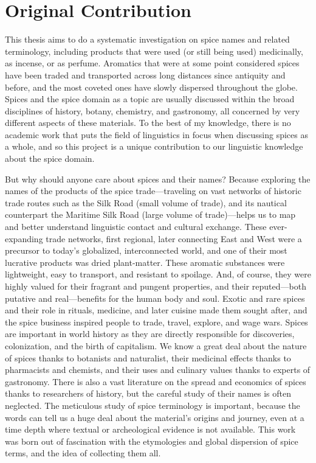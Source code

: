 \section{Original Contribution}

This thesis aims to do a systematic investigation on spice names and related terminology, including products that were used (or still being used) medicinally, as incense, or as perfume. Aromatics that were at some point considered spices have been traded and transported across long distances since antiquity and before, and the most coveted ones have slowly dispersed throughout the globe. Spices and the spice domain as a topic are usually discussed within the broad disciplines of history, botany, chemistry, and gastronomy, all concerned by very different aspects of these materials. To the best of my knowledge, there is no academic work that puts the field of linguistics in focus when discussing spices as a whole, and so this project is a unique contribution to our linguistic knowledge about the spice domain.

But why should anyone care about spices and their names? Because exploring the names of the products of the spice trade---traveling on vast networks of historic trade routes such as the Silk Road (small volume of trade), and its nautical counterpart the Maritime Silk Road (large volume of trade)---helps us to map and better understand linguistic contact and cultural exchange. These ever-expanding trade networks, first regional, later connecting East and West were a precursor to today's globalized, interconnected world, and one of their most lucrative products was dried plant-matter. These aromatic substances were lightweight, easy to transport, and resistant to spoilage. And, of course, they were highly valued for their fragrant and pungent properties, and their reputed---both putative and real---benefits for the human body and soul. Exotic and rare spices and their role in rituals, medicine, and later cuisine made them sought after, and the spice business inspired people to trade, travel, explore, and wage wars. Spices are important in world history as they are directly responsible for discoveries, colonization, and the birth of capitalism. We know a great deal about the nature of spices thanks to botanists and naturalist, their medicinal effects thanks to pharmacists and chemists, and their uses and culinary values thanks to experts of gastronomy. There is also a vast literature on the spread and economics of spices thanks to researchers of history, but the careful study of their names is often neglected. The meticulous study of spice terminology is important, because the words can tell us a huge deal about the material's origins and journey, even at a time depth where textual or archeological evidence is not available. This work was born out of fascination with the etymologies and global dispersion of spice terms, and the idea of collecting them all.

